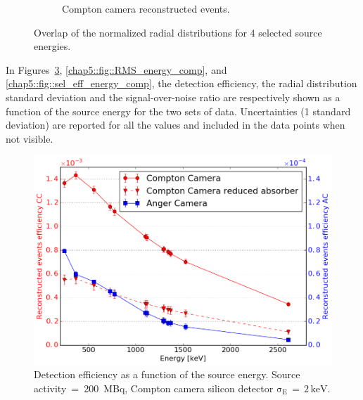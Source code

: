 \begin{figure}
\begin{subfigure}{.5\textwidth}
  \caption{Compton camera reconstructed events.}
  \label{chap5::fig::rad_distr_overlap_CC}
\end{subfigure}
\caption{Overlap of the normalized radial distributions for 4 selected source energies.}
\label{chap5::fig::rad_distr_overlap}
\end{figure} 
               
In Figures~\ref{chap5::fig::eff_energy_comp}, \ref{chap5::fig::RMS_energy_comp}, and \ref{chap5::fig::sel_eff_energy_comp}, the detection efficiency, the radial distribution standard deviation and the signal-over-noise ratio are respectively shown as a function of the source energy for the two sets of data. Uncertainties (1 standard deviation) are reported for all the values and included in the data points when not visible.


\begin{figure}[h!]
\begin{center}
\hspace{0.4cm} \includegraphics[scale=0.4]{03_GraphicFiles/chapter5_SPECTsimu/SPECT/comparison/reduced_absorber/effVSenergy_overlap}
\caption{Detection efficiency as a function of the source energy. Source activity~=~200~MBq, Compton camera silicon detector $\mathrm{\sigma_{E}\,=\,2\,keV}$.}
\label{chap5::fig::eff_energy_comp}
\end{center}
\end{figure}

